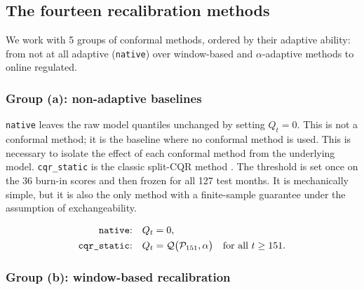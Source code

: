 
\subsection{The fourteen recalibration methods}
\label{sec:conformal:methods}
We work with 5 groups of conformal methods, ordered by their adaptive ability: from not at all adaptive (\texttt{native}) over window-based and $\alpha$-adaptive methods to online regulated.

\subsubsection{Group (a): non-adaptive baselines}
\label{sec:conformal:baselines}

\texttt{native} leaves the raw model quantiles unchanged by setting $Q_t = 0$.
This is not a conformal method; it is the baseline where no conformal method is used. This is necessary to isolate the effect of each conformal method from the underlying model.
\texttt{cqr\_static} is the classic split-CQR method \parencite{romano2019cqr,lei2018distribution}. The threshold
is set once on the 36 burn-in scores and then frozen for all 127 test months.
It is mechanically simple, but it is also the only method with a finite-sample guarantee under the assumption of exchangeability.

\begin{align}
  \text{\texttt{native}:}     \quad Q_t &= 0, \label{eq:m-native}\\
  \text{\texttt{cqr\_static}:} \quad Q_t &= \mathcal{Q}\big(\mathcal{P}_{151}, \alpha\big)
    \quad \text{for all } t \ge 151. \label{eq:m-static}
\end{align}

\subsubsection{Group (b): window-based recalibration}
\label{sec:conformal:window}

